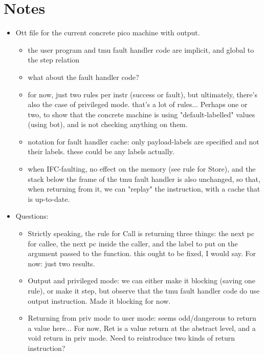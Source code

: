 \documentclass{article}
\begin{document}
\section*{Notes}

\begin{itemize}
\item Ott file for the current concrete pico machine with output.
  \begin{itemize}
    \item the user program and tmu fault handler code are implicit,
      and global to the step relation
    \item what about the fault handler code? 
    \item for now, just two rules per instr (success or fault), but
      ultimately, there's also the case of privileged mode.
      that's a lot of rules...
      Perhaps one or two, to show that the concrete machine is 
      using "default-labelled" values (using bot), and is not checking
      anything on them.
    \item notation for fault handler cache: only payload-labels are
      specified and not their labels. these could be any labels actually.
    \item when IFC-faulting, no effect on the memory (see rule for
      Store), and the stack below the frame of the tmu fault handler
      is also unchanged, so that, when returning from it, we can
      "replay" the instruction, with a cache that is up-to-date.
  \end{itemize}
\item Questions:
  \begin{itemize}
    \item Strictly speaking, the rule for Call is returning three
      things: the next pc for callee, the next pc inside the caller,
      and the label to put on the argument passed to the function.
      this ought to be fixed, I would say. For now: just two results.
    \item Output and privileged mode: we can either make it blocking
      (saving one rule), or make it step, but observe that the tmu
      fault handler code do use output instruction. Made it blocking
      for now.
    \item Returning from priv mode to user mode: seems odd/dangerous
      to return a value here... For now, Ret is a value return at the
      abstract level, and a void return in priv mode. Need to
      reintroduce two kinds of return instruction?
  \end{itemize}
\end{itemize}
\end{document}
